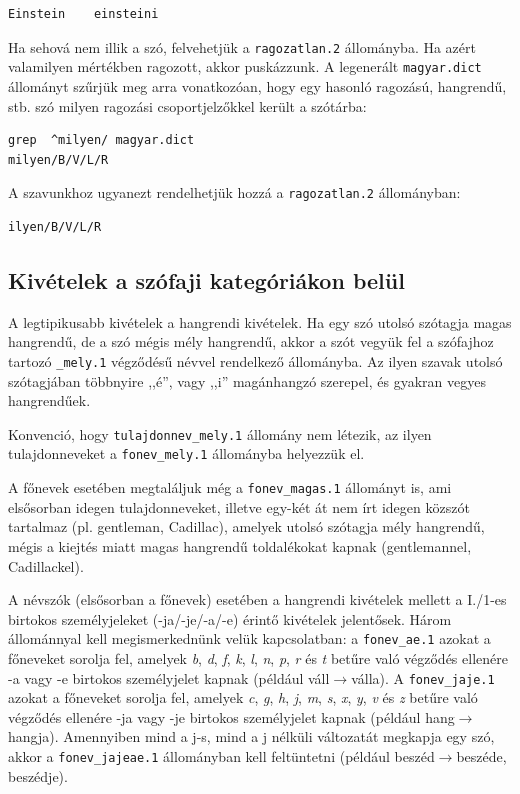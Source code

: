 \begin{verbatim}
Einstein	einsteini
\end{verbatim}

Ha sehová nem illik a szó, felvehetjük a \texttt{ragozatlan.2} állományba.
Ha azért valamilyen mértékben ragozott,
akkor puskázzunk. A legenerált \texttt{magyar.dict}
állományt szűrjük meg arra vonatkozóan,
hogy egy hasonló ragozású, hangrendű, stb. szó milyen ragozási 
csoportjelzőkkel  került a szótárba:

\begin{verbatim}
grep  ^milyen/ magyar.dict
milyen/B/V/L/R
\end{verbatim}

A szavunkhoz ugyanezt rendelhetjük hozzá a \texttt{ragozatlan.2} állományban:

\begin{verbatim}
ilyen/B/V/L/R
\end{verbatim}

\subsection{Kivételek a szófaji kategóriákon belül}

A legtipikusabb kivételek a hangrendi kivételek.
Ha egy szó utolsó szótagja magas hangrendű, de a szó mégis mély
hangrendű, akkor a szót vegyük fel a szófajhoz tartozó
\texttt{\_mely.1} végződésű névvel rendelkező állományba.
Az ilyen szavak utolsó szótagjában többnyire ,,é'', vagy ,,i''
magánhangzó szerepel, és gyakran vegyes hangrendűek.

Konvenció, hogy \texttt{tulajdonnev\_mely.1} állomány nem létezik,
az ilyen tulajdonneveket a \texttt{fonev\_mely.1} állományba
helyezzük el.

A főnevek esetében megtaláljuk még a \texttt{fonev\_magas.1} 
állományt is, ami elsősorban idegen tulajdonneveket, illetve
egy-két át nem írt idegen közszót tartalmaz (pl. gentleman,
Cadillac), amelyek utolsó szótagja mély hangrendű, mégis
a kiejtés miatt magas hangrendű toldalékokat kapnak (gentlemannel,
Cadillackel).

A névszók (elsősorban a főnevek) esetében a hangrendi kivételek mellett a
I./1-es birtokos személyjeleket (-ja/-je/-a/-e) érintő
kivételek jelentősek. Három állománnyal kell
megismerkednünk velük kapcsolatban: a \texttt{fonev\_ae.1} azokat
a főneveket sorolja fel, amelyek \emph{b}, \emph{d}, 
\emph{f}, \emph{k}, \emph{l}, \emph{n}, \emph{p}, \emph{r} és \emph{t} betűre
való végződés ellenére -a vagy -e birtokos személyjelet kapnak (például váll$\rightarrow$válla).
A \texttt{fonev\_jaje.1} azokat
a főneveket sorolja fel, amelyek \emph{c}, \emph{g}, 
\emph{h}, \emph{j}, \emph{m}, \emph{s}, \emph{x}, \emph{y}, \emph{v} és \emph{z} betűre
való végződés ellenére -ja vagy -je birtokos személyjelet kapnak (például hang$\rightarrow$hangja).
Amennyiben mind a j-s, mind a j nélküli változatát megkapja egy szó, akkor a
\texttt{fonev\_jajeae.1} állományban kell feltüntetni (például beszéd$\rightarrow$beszéde, beszédje).

